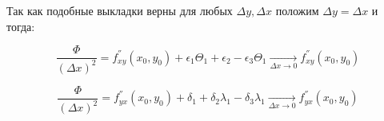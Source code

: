 Так как подобные выкладки верны для любых $\Delta y,\Delta x$ положим $\Delta y = \Delta x$ и тогда:

$$
\frac{\Phi}{(\Delta x)^2} = f_{x y}^{''}(x_0, y_0) + \epsilon_1\Theta_1 + \epsilon_2  - \epsilon_3\Theta_1\underset{\Delta x \to 0}{\longrightarrow} f_{x y}^{''}(x_0, y_0)
$$ 

$$
\frac{\Phi}{(\Delta x)^2} = f_{y x}^{''}(x_0, y_0) + \delta_1 + \delta_2\lambda_1 - \delta_3\lambda_1 \underset{\Delta x \to 0}{\longrightarrow} f_{y x}^{''}(x_0, y_0)
$$
